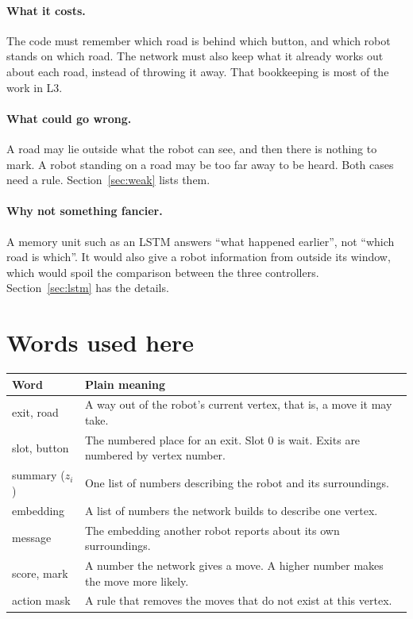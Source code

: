 \documentclass[11pt,a4paper]{article}
\begin{document}
\paragraph{What it costs.} The code must remember which road is behind which
button, and which robot stands on which road. The network must also keep what
it already works out about each road, instead of throwing it away. That
bookkeeping is most of the work in L3.

\paragraph{What could go wrong.} A road may lie outside what the robot can
see, and then there is nothing to mark. A robot standing on a road may be too
far away to be heard. Both cases need a rule. Section~\ref{sec:weak} lists
them.

\paragraph{Why not something fancier.} A memory unit such as an LSTM answers
``what happened earlier'', not ``which road is which''. It would also give a
robot information from outside its window, which would spoil the comparison
between the three controllers. Section~\ref{sec:lstm} has the details.

\section{Words used here}

\begin{center}
\small
\begin{tabular}{@{}p{3.2cm}p{11.8cm}@{}}
\toprule
Word & Plain meaning \\
\midrule
exit, road & A way out of the robot's current vertex, that is, a move it may take. \\[2pt]
slot, button & The numbered place for an exit. Slot 0 is wait. Exits are numbered by vertex number. \\[2pt]
summary ($z_i$) & One list of numbers describing the robot and its surroundings. \\[2pt]
embedding & A list of numbers the network builds to describe one vertex. \\[2pt]
message & The embedding another robot reports about its own surroundings. \\[2pt]
score, mark & A number the network gives a move. A higher number makes the move more likely. \\[2pt]
action mask & A rule that removes the moves that do not exist at this vertex. \\
\bottomrule
\end{tabular}
\end{center}
\end{document}
